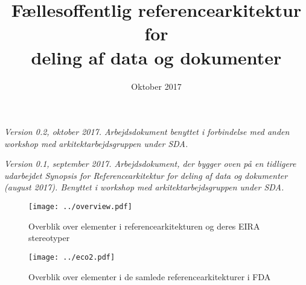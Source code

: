 \documentclass[10pt]{article}
\title{Fællesoffentlig referencearkitektur for \\ deling af data og dokumenter}
\author{}
\date{Oktober 2017}
\begin{document}
\maketitle

\emph{Version 0.2, oktober 2017. Arbejdsdokument benyttet i forbindelse
med anden workshop med arkitektarbejdsgruppen under SDA.}

\emph{Version 0.1, september 2017. Arbejdsdokument, der bygger oven på
en tidligere udarbejdet Synopsis for Referencearkitektur for deling af
data og dokumenter (august 2017). Benyttet i workshop med
arkitektarbejdsgruppen under SDA.}
\tableofcontents
\newpage




\newpage
\thispagestyle{empty}
\begin{figure}
\centering
\texttt{[image: ../overview.pdf]}
\caption{Overblik over elementer i referencearkitekturen og deres EIRA stereotyper}
\end{figure}

\newpage
\thispagestyle{empty}
\begin{figure}
\centering
\texttt{[image: ../eco2.pdf]}
\caption{Overblik over elementer i de samlede referencearkitekturer i FDA}
\end{figure}
\end{document}
